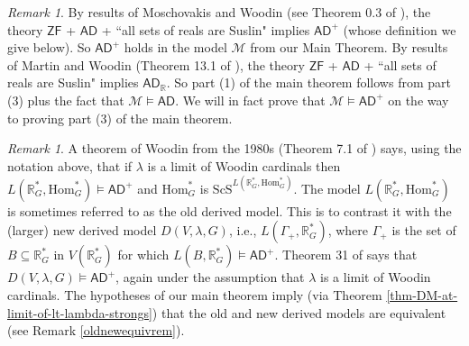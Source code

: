 \documentclass[fleqn, 11pt]{amsart}
\theoremstyle{plain}
\theoremstyle{definition}
\theoremstyle{remark}
\newtheorem{rem}[thm]{Remark} \newtheorem*{rem*}{Remark}
\newcommand{\Hom}{\mathrm{Hom}}
\newcommand{\ScS}{\mathrm{ScS}}
\newcommand{\bbR}{\mathbb{R}}
\newcommand{\ZF}{\mathsf{ZF}}
\newcommand{\AD}{\mathsf{AD}}
\newcommand{\ADR}{\mathsf{AD}_{\bbR}}
\begin{document}

\begin{rem}\label{relrem} By results of Moschovakis and Woodin (see Theorem 0.3 of \cite{Larson:Extensions}), the theory $\ZF$ + $\AD$ + ``all sets of reals are Suslin" implies $\AD^{+}$ (whose definition we give below). So $\AD^{+}$ holds in the model $\mathcal{M}$ from our Main Theorem. 
By results of Martin and Woodin (Theorem 13.1 of \cite{Larson:Extensions}), the theory $\ZF$ + $\AD$ + ``all sets of reals are Suslin" implies $\ADR$. So part (1) of the main theorem follows from part (3) plus the fact that $\mathcal{M} \models \AD$. We will in fact prove that $\mathcal{M} \models \AD^{+}$ on the way to proving part (3) of the main theorem. 
\end{rem}

\begin{rem}\label{oldnewrem}
A theorem of Woodin from the 1980s (Theorem 7.1 of \cite{SteDMT}) says, using the notation above, that if $\lambda$ is a limit of Woodin cardinals then $L(\bbR^{*}_{G}, \Hom^{*}_{G}) \models \AD^{+}$ and $\Hom^{*}_{G}$ is $\ScS^{L(\bbR^{*}_{G}, \Hom^{*}_{G})}$. The model $L(\bbR^{*}_{G}, \Hom^{*}_{G})$ is sometimes referred to as the old derived model. This is to contrast it with the (larger) new derived model $D(V, \lambda, G)$, i.e., $L(\Gamma_{+}, \bbR^{*}_{G})$, where $\Gamma_{+}$ is the set of $B \subseteq \bbR^{*}_{G}$ in $V(\bbR^{*}_{G})$ 
for which $L(B, \bbR^{*}_{G}) \models \AD^{+}$. Theorem 31 of \cite{WooSEMI} says that $D(V, \lambda, G) \models \AD^{+}$, again under the assumption that $\lambda$ is a limit of Woodin cardinals. The hypotheses of our main theorem imply (via Theorem \ref{thm-DM-at-limit-of-lt-lambda-strongs}) that the old and new derived models are equivalent (see Remark \ref{oldnewequivrem}). 
\end{rem} 




\end{document}
